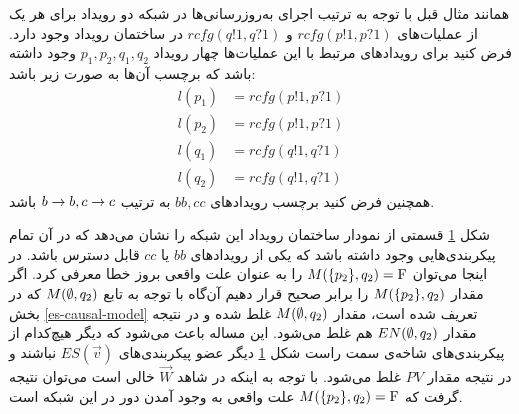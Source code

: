 همانند مثال قبل با توجه به ترتیب اجرای به‌روز‌رسانی‌ها در شبکه دو رویداد برای هر یک از عملیات‌های
$rcfg(p!1,p?1)$
و
$rcfg(q!1,q?1)$
در ساختمان رویداد وجود دارد.
فرض کنید برای رویداد‌های مرتبط با این عملیات‌ها چهار رویداد
$p_1,p_2,q_1,q_2$
وجود داشته باشد که برچسب آن‌ها به صورت زیر باشد:
\begin{align*}
    l(p_1)  & = rcfg(p!1,p?1) \\
    l(p_2)  & = rcfg(p!1,p?1) \\
    l(q_1)  & = rcfg(q!1,q?1) \\
    l(q_2)  & = rcfg(q!1,q?1) 
\end{align*}
همچنین فرض کنید برچسب رویداد‌های 
$bb,cc$
به ترتیب 
$b\rightarrow b,c\rightarrow c$
باشد.
\begin{figure}
    \centering
    \caption{}
    \label{fig:loop:es}
\end{figure}
شکل
\ref{fig:loop:es}
قسمتی از نمودار ساختمان رویداد این شبکه را نشان می‌دهد که در آن تمام پیکر‌بندی‌هایی وجود داشته باشد که یکی از رویداد‌های
$bb$
یا
$cc$
قابل دسترس باشد.
در اینجا می‌توان 
$M(\{p_2\},q_2)= \mathrm{F}$
را به عنوان علت واقعی بروز خطا معرفی کرد.
 اگر مقدار
$M(\{p_2\},q_2)$
را برابر صحیح قرار دهیم آن‌گاه با توجه به تابع 
$M(\emptyset,q_2)$
که در بخش 
\ref{es-causal-model}
تعریف شده است، مقدار 
$M(\emptyset,q_2)$
غلط شده و در نتیجه مقدار 
$EN(\emptyset,q_2)$
هم غلط می‌شود.
این مساله باعث می‌شود که دیگر هیچ‌کدام از پیکربندی‌های شاخه‌ی سمت راست شکل
\ref{fig:loop:es}
دیگر عضو پیکربندی‌های 
$ES(\vec v)$
نباشند و در نتیجه مقدار 
$PV$
غلط می‌شود.
با توجه به اینکه در شاهد
$\vec W$
خالی است می‌توان نتیجه گرفت که 
$M(\{p_2\},q_2) = \mathrm{F}$
علت واقعی به وجود آمدن دور در این شبکه است.
